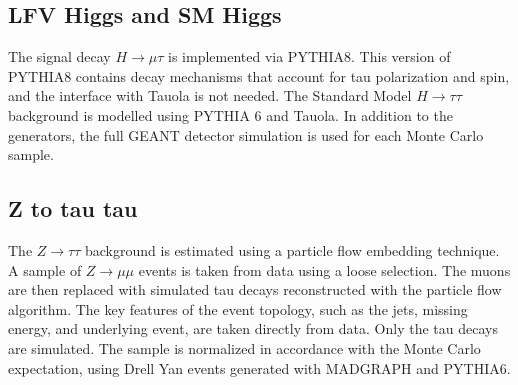 \documentclass[oneside, letterpaper, oldfontcommands]{memoir}
\begin{document}
\subsection{LFV Higgs and SM Higgs}
\qquad The signal decay $H \rightarrow \mu\tau$ is implemented via PYTHIA8. This version of PYTHIA8 contains decay mechanisms that account for tau polarization and spin, and the interface with Tauola is not needed\cite{Sjostrand:2014zea}. The Standard Model $H \rightarrow \tau\tau$ background is modelled using PYTHIA 6 and Tauola. In addition to the generators, the full GEANT detector simulation is used for each Monte Carlo sample.

\subsection{Z to tau tau}
\qquad The $Z \rightarrow \tau\tau$ background is estimated using a particle flow embedding technique. A sample of $Z \rightarrow \mu\mu$ events is taken from data using a loose selection. The muons are then replaced with simulated tau decays reconstructed with the particle flow algorithm. The key features of the event topology, such as the jets, missing energy, and underlying event, are taken directly from data. Only the tau decays are simulated. The sample is normalized in accordance with the Monte Carlo expectation, using Drell Yan events generated with MADGRAPH and PYTHIA6.
\end{document}
